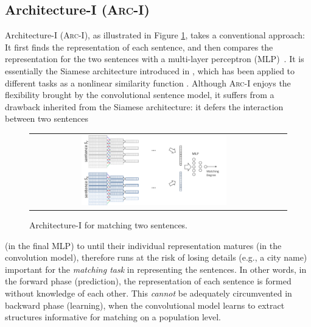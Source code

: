\documentclass{article} %
\begin{document}
\subsection{Architecture-I (\textsc{Arc-I})} \vspace{-10pt}
Architecture-I (\textsc{Arc-I}),  as illustrated in Figure \ref{f:1DCNN}, takes a conventional approach: It first finds the representation of each sentence, and then compares the representation for the two sentences with a multi-layer perceptron (\textsc{MLP})~\cite{DeepAI}. It is essentially the Siamese architecture introduced in \cite{bordes2014semantic, cnn}, which has been applied to different tasks as a nonlinear similarity function \cite{Sun_2013_ICCV}. Although \textsc{Arc-I} enjoys the flexibility brought by the convolutional sentence model, it suffers from a drawback inherited from the Siamese architecture: it defers the interaction  between two sentences
\begin{figure}
\begin{center}
    \begin{tabular}[c]{cc}
     \includegraphics[width=0.6\textwidth]{pics/1dCNN_B.png}
     \end{tabular}
\vspace{-10pt}
    \caption{Architecture-I for matching two sentences.} \vspace{-5pt}
    \label{f:1DCNN}
  \end{center}
\end{figure} %
(in the final MLP) to until their individual representation matures (in the convolution model), therefore runs at the risk of losing details (e.g., a city name) important for the \emph{matching task} in representing the sentences. In other words, in the forward phase (prediction), the representation of each sentence is formed without knowledge of each other. This \emph{cannot} be adequately circumvented in backward phase (learning), when the convolutional model learns to extract structures informative for matching on a population level.
\end{document}
